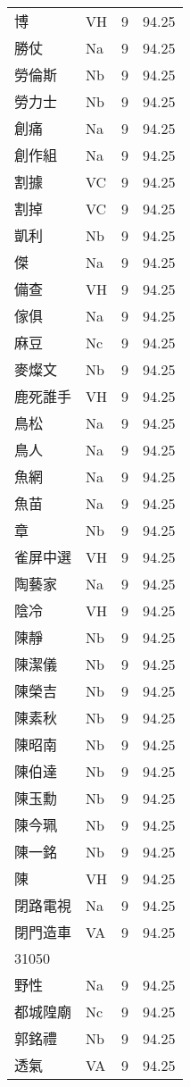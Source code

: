 \documentclass[twocolumn]{book}
\begin{document}
\begin{supertabular}{llrr}
博 & VH & 9 &  94.25\\
勝仗 & Na & 9 &  94.25\\
勞倫斯 & Nb & 9 &  94.25\\
勞力士 & Nb & 9 &  94.25\\
創痛 & Na & 9 &  94.25\\
創作組 & Na & 9 &  94.25\\
割據 & VC & 9 &  94.25\\
割掉 & VC & 9 &  94.25\\
凱利 & Nb & 9 &  94.25\\
傑 & Na & 9 &  94.25\\
備查 & VH & 9 &  94.25\\
傢俱 & Na & 9 &  94.25\\
麻豆 & Nc & 9 &  94.25\\
麥燦文 & Nb & 9 &  94.25\\
鹿死誰手 & VH & 9 &  94.25\\
鳥松 & Na & 9 &  94.25\\
鳥人 & Na & 9 &  94.25\\
魚網 & Na & 9 &  94.25\\
魚苗 & Na & 9 &  94.25\\
章 & Nb & 9 &  94.25\\
雀屏中選 & VH & 9 &  94.25\\
陶藝家 & Na & 9 &  94.25\\
陰冷 & VH & 9 &  94.25\\
陳靜 & Nb & 9 &  94.25\\
陳潔儀 & Nb & 9 &  94.25\\
陳榮吉 & Nb & 9 &  94.25\\
陳素秋 & Nb & 9 &  94.25\\
陳昭南 & Nb & 9 &  94.25\\
陳伯達 & Nb & 9 &  94.25\\
陳玉勳 & Nb & 9 &  94.25\\
陳今珮 & Nb & 9 &  94.25\\
陳一銘 & Nb & 9 &  94.25\\
陳 & VH & 9 &  94.25\\
閉路電視 & Na & 9 &  94.25\\
閉門造車 & VA & 9 &  94.25\\
31050\\
野性 & Na & 9 &  94.25\\
都城隍廟 & Nc & 9 &  94.25\\
郭銘禮 & Nb & 9 &  94.25\\
透氣 & VA & 9 &  94.25\\

\end{supertabular}
\end{document}

